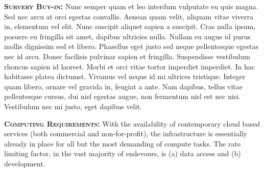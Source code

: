 \documentclass[oneside, a4paper, onecolumn, 11pt]{article}
\begin{document}
\smallskip
\smallskip
\noindent
\textbf{\textsc{Survery Buy-in:}} 
Nunc semper quam et leo interdum vulputate eu quis magna. Sed nec arcu at orci egestas convallis. Aenean quam velit, aliquam vitae viverra in, elementum vel elit. Nunc suscipit aliquet sapien a suscipit. Cras nulla ipsum, posuere eu fringilla sit amet, dapibus ultricies nulla. Nullam eu augue id purus mollis dignissim sed et libero. Phasellus eget justo sed neque pellentesque egestas nec id arcu. Donec facilisis pulvinar sapien et fringilla. Suspendisse vestibulum rhoncus sapien id laoreet. Morbi et orci vitae tortor imperdiet imperdiet. In hac habitasse platea dictumst. Vivamus vel neque id mi ultrices tristique. Integer quam libero, ornare vel gravida in, feugiat a ante. Nam dapibus, tellus vitae pellentesque cursus, dui nisl egestas augue, non fermentum nisl est nec nisi. Vestibulum nec mi justo, eget dapibus velit.

\smallskip
\smallskip
\noindent
\textbf{\textsc{Computing Requirements:}} 
With the availability of contemporary cloud based services (both
commercial and non-for-profit), the infrastructure is essentially
already in place for all but the most demanding of compute tasks. The
rate limiting factor, in the vast majority of endevours, is (a) data
access and (b) development.
\end{document}
